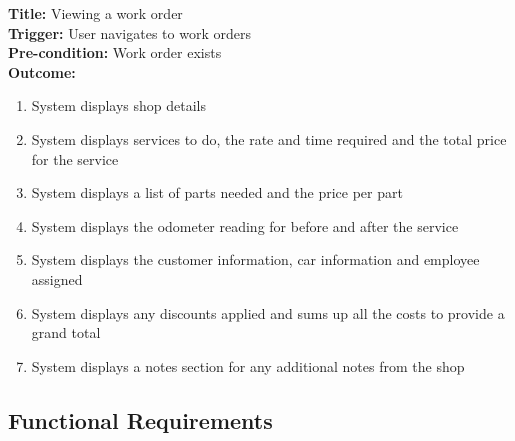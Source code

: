 \documentclass[12pt]{article}
\begin{document}
\textbf{Title:} Viewing a work order\\
\textbf{Trigger:} User navigates to work orders\\
\textbf{Pre-condition:} Work order exists\\
\textbf{Outcome:}
\begin{enumerate}
	\item System displays shop details
	\item System displays services to do, the rate and time required and the total price for the service
	\item System displays a list of parts needed and the price per part
	\item System displays the odometer reading for before and after the service
	\item System displays the customer information, car information and employee assigned
	\item System displays any discounts applied and sums up all the costs to provide a grand total
	\item System displays a notes section for any additional notes from the shop
\end{enumerate}

\subsection{Functional Requirements}
\end{document}
